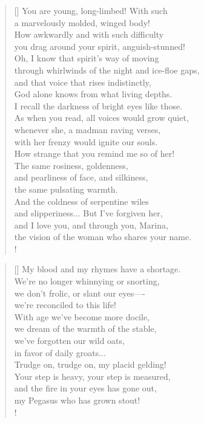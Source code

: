 \documentclass[]{article}
\begin{document}
\settowidth{\versewidth}{How awkwardly and with such difficulty  }
\begin{verse}[\versewidth]
You are young, long-limbed! With such\\
a marvelously molded, winged body!\\
How awkwardly and with such difficulty\\
you drag around your spirit, anguish-stunned!\\
Oh, I know that spirit's way of moving\\
through whirlwinds of the night and ice-floe gaps,\\
and that voice that rises indistinctly,\\
God alone knows from what living depths.\\
I recall the darkness of bright eyes like those.\\
As when you read, all voices would grow quiet,\\
whenever she, a madman raving verses,\\
with her frenzy would ignite our souls.\\
How strange that you remind me so of her!\\
The same rosiness, goldenness,\\
and pearliness of face, and silkiness,\\
the same pulsating warmth.\\
And the coldness of serpentine wiles\\
and slipperiness... But I've forgiven her,\\
and I love you, and through you, Marina,\\
the vision of the woman who shares your name.\\!
\end{verse}
\bigskip \bigskip

\settowidth{\versewidth}{My blood and my rhymes have a shortage }
\begin{verse}[\versewidth]
My blood and my rhymes have a shortage.\\
We're no longer whinnying or snorting,\\
we don't frolic, or slant our eyes—- \\
we're reconciled to this life!\\
With age we've become more docile,\\
we dream of the warmth of the stable,\\
we've forgotten our wild oats,\\
in favor of daily groats... \\
Trudge on, trudge on, my placid gelding!\\
Your step is heavy, your step is measured,\\
and the fire in your eyes has gone out,\\
my Pegasus who has grown stout!\\!
\end{verse}
\newpage 
\end{document}
